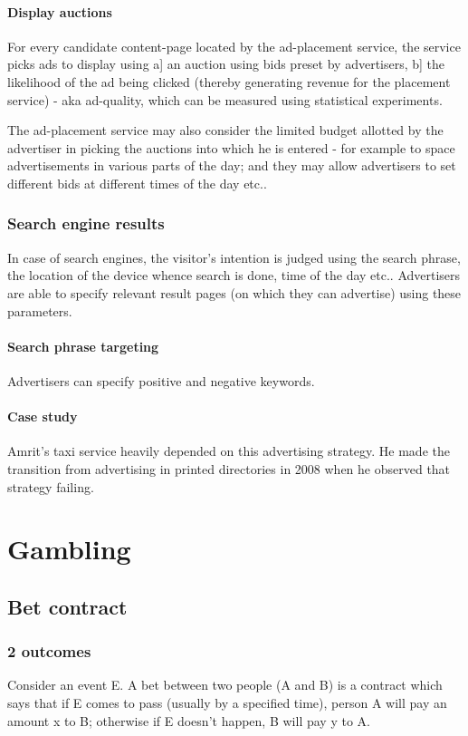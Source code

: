 \documentclass[oneside, article]{memoir}
\begin{document}
\subsubsection{Display auctions}
For every candidate content-page located by the ad-placement service, the service picks ads to display using a] an auction using bids preset by advertisers, b] the likelihood of the ad being clicked (thereby generating revenue for the placement service) - aka ad-quality, which can be measured using statistical experiments.

The ad-placement service may also consider the limited budget allotted by the advertiser in picking the auctions into which he is entered - for example to space advertisements in various parts of the day; and they may allow advertisers to set different bids at different times of the day etc..

\subsection{Search engine results}
In case of search engines, the visitor's intention is judged using the search phrase, the location of the device whence search is done, time of the day etc.. Advertisers are able to specify relevant result pages (on which they can advertise) using these parameters.

\subsubsection{Search phrase targeting}
Advertisers can specify positive and negative keywords. \tbc

\subsubsection{Case study}
Amrit's taxi service heavily depended on this advertising strategy. He made the transition from advertising in printed directories in 2008 when he observed that strategy failing.

\tbc

\chapter{Gambling}
\section{Bet contract}
\subsection{2 outcomes}
Consider an event E. A bet between two people (A and B) is a contract which says that if E comes to pass (usually by a specified time), person A will pay an amount x to B; otherwise if E doesn't happen, B will pay y to A.
\end{document}
